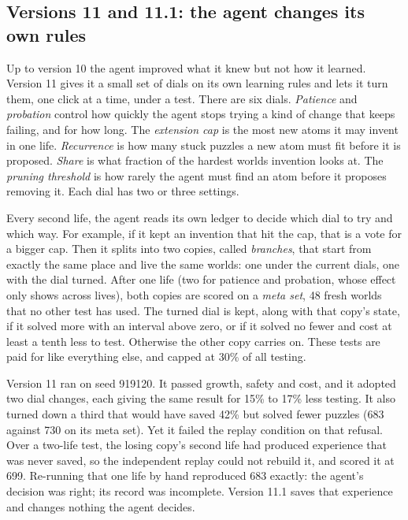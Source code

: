 \documentclass[11pt]{article}
\begin{document}
\subsection{Versions 11 and 11.1: the agent changes its own rules}
\label{sec:meta}

Up to version 10 the agent improved what it knew but not how it learned. Version 11 gives it a small set of dials on its own learning rules and lets it turn them, one click at a time, under a test. There are six dials. \emph{Patience} and \emph{probation} control how quickly the agent stops trying a kind of change that keeps failing, and for how long. The \emph{extension cap} is the most new atoms it may invent in one life. \emph{Recurrence} is how many stuck puzzles a new atom must fit before it is proposed. \emph{Share} is what fraction of the hardest worlds invention looks at. The \emph{pruning threshold} is how rarely the agent must find an atom before it proposes removing it. Each dial has two or three settings.

Every second life, the agent reads its own ledger to decide which dial to try and which way. For example, if it kept an invention that hit the cap, that is a vote for a bigger cap. Then it splits into two copies, called \emph{branches}, that start from exactly the same place and live the same worlds: one under the current dials, one with the dial turned. After one life (two for patience and probation, whose effect only shows across lives), both copies are scored on a \emph{meta set}, 48 fresh worlds that no other test has used. The turned dial is kept, along with that copy's state, if it solved more with an interval above zero, or if it solved no fewer and cost at least a tenth less to test. Otherwise the other copy carries on. These tests are paid for like everything else, and capped at 30\% of all testing.

Version 11 ran on seed 919120. It passed growth, safety and cost, and it adopted two dial changes, each giving the same result for 15\% to 17\% less testing. It also turned down a third that would have saved 42\% but solved fewer puzzles (683 against 730 on its meta set). Yet it failed the replay condition on that refusal. Over a two-life test, the losing copy's second life had produced experience that was never saved, so the independent replay could not rebuild it, and scored it at 699. Re-running that one life by hand reproduced 683 exactly: the agent's decision was right; its record was incomplete. Version 11.1 saves that experience and changes nothing the agent decides.
\end{document}
